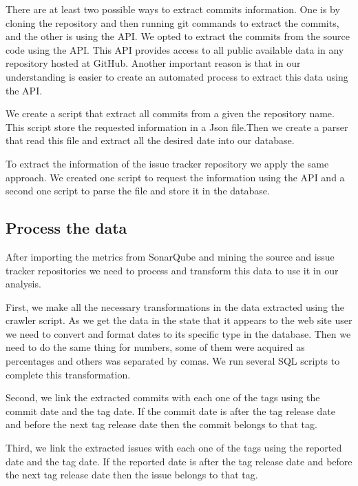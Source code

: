 There are at least two possible ways to extract commits information. One is by cloning the repository and then running git commands to extract the commits, and the other is using the API. We opted to extract the commits from the source code using the API. This API provides access to all public available data in any repository hosted at GitHub. Another important reason is that in our understanding is easier to create an automated process to extract this data using the API. 

We create a script that extract all commits from a given the repository name. This script store the requested information in a Json file.Then we create a parser that read this file and extract all the desired date into our database.

To extract the information of the issue tracker repository we apply the same approach. We created one script to request the information using the API and a second one script to parse the file and store it in the database.

\subsection{Process the data}

After importing the metrics from SonarQube and mining the source and issue tracker repositories we need to process and transform this data to use it in our analysis. 

First, we make all the necessary transformations in the data extracted using the crawler script. As we get the data in the state that it appears to the web site user we need to convert and format dates to its specific type in the database. Then we need to do the same thing for numbers, some of them were acquired as percentages and others was separated by comas. We run several SQL scripts to complete this transformation.

Second, we link the extracted commits with each one of the tags using the commit date and the tag date. If the commit date is after the tag release date and before the next tag release date then the commit belongs to that tag.

Third, we link the extracted issues with each one of the tags using the reported date and the tag date. If the reported date is after the tag release date and before the next tag release date then the issue belongs to that tag.

